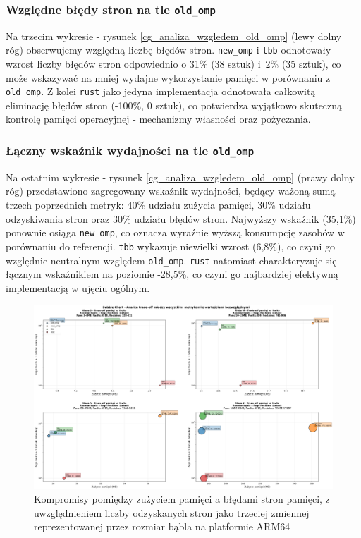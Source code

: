 \subsubsection{Względne błędy stron na tle \texttt{old\_omp}}
Na trzecim wykresie - rysunek \ref{cg_analiza_wzgledem_old_omp} (lewy dolny róg) obserwujemy względną liczbę błędów stron. \texttt{new\_omp} i \texttt{tbb} odnotowały wzrost liczby błędów stron odpowiednio o 31\% (38 sztuk) i~2\% (35 sztuk), co może wskazywać na mniej wydajne wykorzystanie pamięci w porównaniu z \texttt{old\_omp}. Z kolei \texttt{rust} jako jedyna implementacja odnotowała całkowitą eliminację błędów stron (-100\%, 0 sztuk), co potwierdza wyjątkowo skuteczną kontrolę pamięci operacyjnej - mechanizmy własności oraz pożyczania.

\subsubsection{Łączny wskaźnik wydajności na tle \texttt{old\_omp}}
Na ostatnim wykresie - rysunek \ref{cg_analiza_wzgledem_old_omp} (prawy dolny róg) przedstawiono zagregowany wskaźnik wydajności, będący ważoną sumą trzech poprzednich metryk: 40\% udziału zużycia pamięci, 30\% udziału odzyskiwania stron oraz 30\% udziału błędów stron. Najwyższy wskaźnik (35,1\%) ponownie osiąga \texttt{new\_omp}, co oznacza wyraźnie wyższą konsumpcję zasobów w porównaniu do referencji. \texttt{tbb} wykazuje niewielki wzrost (6,8\%), co czyni go względnie neutralnym względem \texttt{old\_omp}. \texttt{rust} natomiast charakteryzuje się łącznym wskaźnikiem na poziomie -28,5\%, co czyni go najbardziej efektywną implementacją w ujęciu ogólnym.

\begin{figure}[H]
    \centering
    \includegraphics[width=\textwidth]{analiza/images/parallel/cg/arm/chart_06_bubble_chart.png}
    \caption{Kompromisy  pomiędzy zużyciem pamięci a błędami stron pamięci, z uwzględnieniem liczby odzyskanych stron jako trzeciej zmiennej reprezentowanej przez rozmiar bąbla na platformie ARM64}
    \label{cg_kompromisy_pamiec_bledy}
\end{figure}

